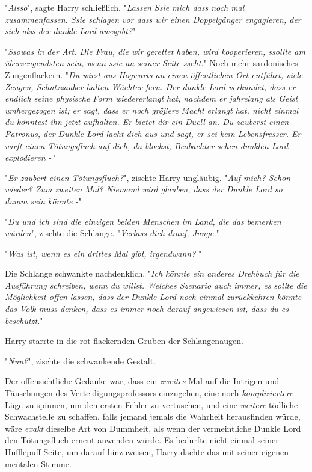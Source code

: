 {"\emph{Alsso}", sagte Harry schließlich. "\emph{Lassen Ssie mich dass noch mal zusammenfassen. Ssie schlagen vor dass wir einen Doppelgänger engagieren, der sich alss der dunkle Lord aussgibt?}"

"\emph{Ssowas in der Art. Die Frau, die wir gerettet haben, wird kooperieren, ssollte am überzeugendsten sein, wenn ssie an seiner Seite sseht.}" Noch mehr sardonisches Zungenflackern. "\emph{Du wirst aus Hogwarts an einen öffentlichen Ort entführt, viele Zeugen, Schutzzauber halten Wächter fern. Der dunkle Lord verkündet, dass er endlich seine physische Form wiedererlangt hat, nachdem er jahrelang als Geist umhergezogen ist; er sagt, dass er noch größere Macht erlangt hat, nicht einmal du könntest ihn jetzt aufhalten. Er bietet dir ein Duell an. Du zauberst einen Patronus, der Dunkle Lord lacht dich aus und sagt, er sei kein Lebensfresser. Er wirft einen Tötungsfluch auf dich, du blockst, Beobachter sehen dunklen Lord explodieren -"}

"\emph{Er zaubert einen Tötungsfluch?}", zischte Harry ungläubig. "\emph{Auf mich? Schon wieder? Zum zweiten Mal? Niemand wird glauben, dass der Dunkle Lord so dumm sein könnte -}"

"\emph{Du und ich sind die einzigen beiden Menschen im Land, die das bemerken würden}", zischte die Schlange. "\emph{Verlass dich drauf, Junge.}"

"\emph{Was ist, wenn es ein drittes Mal gibt, irgendwann?} "

Die Schlange schwankte nachdenklich. "\emph{Ich könnte ein anderes Drehbuch für die Ausführung schreiben, wenn du willst. Welches Szenario auch immer, es sollte die Möglichkeit offen lassen, dass der Dunkle Lord noch einmal zurückkehren könnte - das Volk muss denken, dass es immer noch darauf angewiesen ist, dass du es beschützt.}"

Harry starrte in die rot flackernden Gruben der Schlangenaugen.

"\emph{Nun?}", zischte die schwankende Gestalt.

Der offensichtliche Gedanke war, dass ein \emph{zweites} Mal auf die Intrigen und Täuschungen des Verteidigungsprofessors einzugehen, eine noch \emph{kompliziertere} Lüge zu spinnen, um den ersten Fehler zu vertuschen, und eine \emph{weitere} tödliche Schwachstelle zu schaffen, falls jemand jemals die Wahrheit herausfinden würde, wäre \emph{exakt} dieselbe Art von Dummheit, als wenn der vermeintliche Dunkle Lord den Tötungsfluch erneut anwenden würde. Es bedurfte nicht einmal seiner Hufflepuff-Seite, um darauf hinzuweisen, Harry dachte das mit seiner eigenen mentalen Stimme.

}
